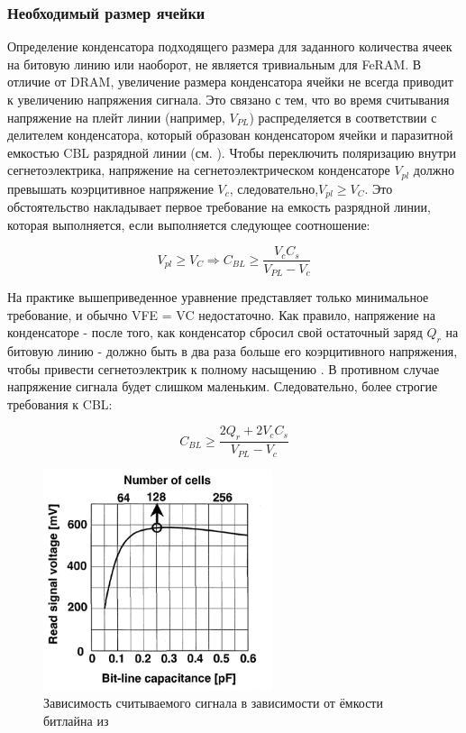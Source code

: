 \documentclass[a4paper,12pt]{article} %
\begin{document}
\subsubsection{Необходимый размер ячейки}
Определение конденсатора подходящего размера  для заданного количества ячеек на битовую линию или наоборот, не является тривиальным для FeRAM. В отличие от DRAM, увеличение размера конденсатора ячейки не всегда приводит к увеличению напряжения сигнала. Это связано с тем, что во время считывания напряжение на плейт линии (например, $V_{PL} $) распределяется в соответствии с делителем конденсатора, который образован конденсатором ячейки и паразитной емкостью CBL разрядной линии (см. ). Чтобы переключить поляризацию внутри сегнетоэлектрика, напряжение на сегнетоэлектрическом конденсаторе $V_{pl}$ должно превышать коэрцитивное напряжение $V_c $, следовательно,$ V_{pl} \geqslant V_C$. Это обстоятельство накладывает первое требование на емкость разрядной линии, которая выполняется, если выполняется следующее соотношение:

\begin{equation}
	V_{pl} \geqslant V_C  \Rightarrow C_{BL} \geqslant \frac{V_c C_s}{V_{PL} - V_c}  
\end{equation}


На практике вышеприведенное уравнение представляет только минимальное требование, и обычно VFE = VC недостаточно. Как правило, напряжение на конденсаторе - после того, как конденсатор сбросил свой остаточный заряд $Q_r $  на битовую линию - должно быть в два раза больше его коэрцитивного напряжения, чтобы привести сегнетоэлектрик к полному насыщению \cite{fram18}. В противном случае напряжение сигнала будет слишком маленьким. Следовательно, более строгие требования к CBL:


$$ C_{BL} \geqslant \frac{2Q_r + 2V_c C_s }{V_{PL} - V_c  }  $$



  \begin{figure}[H]
  \centering
  \includegraphics[width=0.6\textwidth]{19.png}
  \caption{Зависимость считываемого сигнала в зависимости от ёмкости битлайна из \cite{lib:c_bl}}
  \label{pic:19}
  \end{figure}
\end{document}

